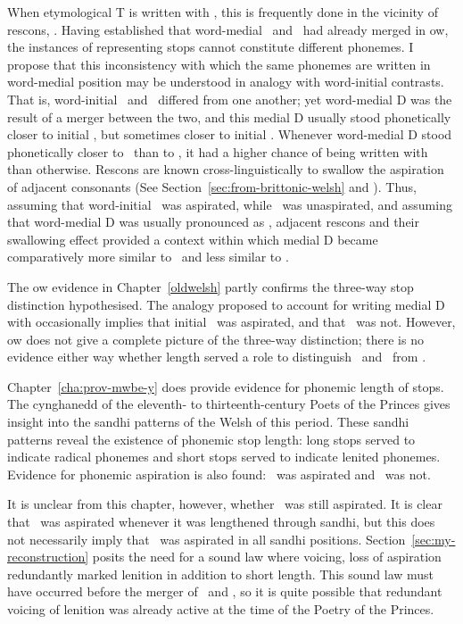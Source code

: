When etymological \gls{T} is written with , this is frequently done in the vicinity of \gls{rescon}s, \ie {}. Having established that word-medial \xD\ and \lT\ had already merged in \gls{ow}, the instances of  representing stops cannot constitute different phonemes. I propose that this inconsistency with which the same phonemes are written in word-medial position may be understood in analogy with word-initial contrasts. That is, word-initial \lT\ and \xD\ differed from one another; yet word-medial \gls{D} was the result of a merger between the two, and this medial \gls{D} usually stood phonetically closer to initial \lT, but sometimes closer to initial \xD. Whenever word-medial \gls{D} stood phonetically closer to \xD\ than to \lT, it had a higher chance of being written with  than otherwise. \Gls{Rescon}s are known cross-linguistically to swallow the aspiration of adjacent consonants (See Section~\ref{sec:from-brittonic-welsh} and \textcite{koch_*cothairche_1990}). Thus, assuming that word-initial \lT\ was aspirated, while \xD\ was unaspirated, and assuming that word-medial \gls{D} was usually pronounced as \lT, adjacent \gls{rescon}s and their swallowing effect provided a context within which medial \gls{D} became comparatively more similar to \xD\ and less similar to \lT.

The \gls{ow} evidence in Chapter~\ref{oldwelsh} partly confirms the three-way stop distinction hypothesised. The analogy proposed to account for writing medial \gls{D} with  occasionally implies that initial \lT\ was aspirated, and that \xD\ was not. However, \gls{ow} does not give a complete picture of the three-way distinction; there is no evidence either way whether length served a role to distinguish \xT\ and \xD\ from \lT.

Chapter~\ref{cha:prov-mwbe-y} does provide evidence for phonemic length of stops. The cynghanedd of the eleventh- to thirteenth-century Poets of the Princes gives insight into the sandhi patterns of the Welsh of this period. These sandhi patterns reveal the existence of phonemic stop length: long stops served to indicate radical phonemes and short stops served to indicate lenited phonemes. Evidence for phonemic aspiration is also found: \xT\ was aspirated and \xD\ was not.

It is unclear from this chapter, however, whether \lT\ was still aspirated. It is clear that \lT\ was aspirated whenever it was lengthened through sandhi, but this does not necessarily imply that \lT\ was aspirated in all sandhi positions. Section~\ref{sec:my-reconstruction} posits the need for a sound law where voicing, \ie loss of aspiration redundantly marked lenition in addition to short length. This sound law must have occurred before the merger of \lT\ and \xD, so it is quite possible that redundant voicing of lenition was already active at the time of the Poetry of the Princes.

